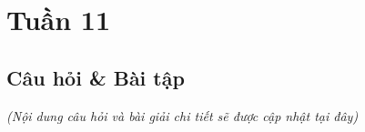 \section{Tuần 11}
\label{sec:week11}

\subsection{Câu hỏi \& Bài tập}
\textit{(Nội dung câu hỏi và bài giải chi tiết sẽ được cập nhật tại đây)}
